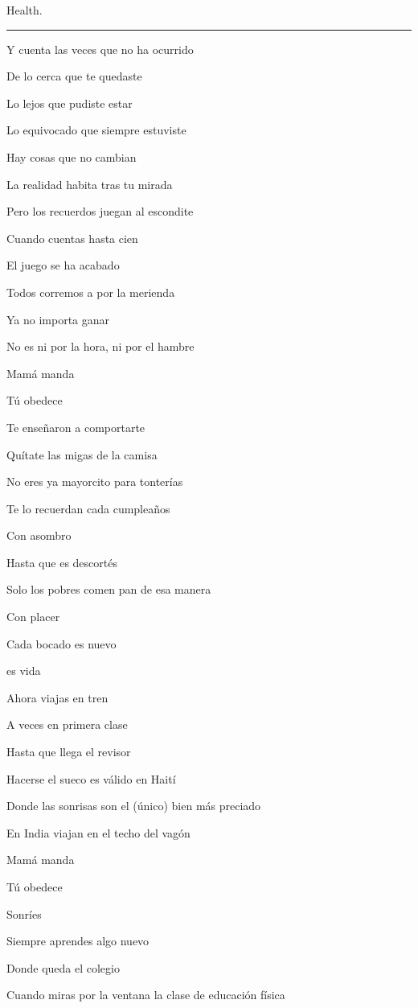 \documentclass[]{book}
\begin{document}
Health.

\begin{center}\rule{0.5\linewidth}{\linethickness}\end{center}

Y cuenta las veces que no ha ocurrido

De lo cerca que te quedaste

Lo lejos que pudiste estar

Lo equivocado que siempre estuviste

Hay cosas que no cambian

La realidad habita tras tu mirada

Pero los recuerdos juegan al escondite

Cuando cuentas hasta cien

El juego se ha acabado

Todos corremos a por la merienda

Ya no importa ganar

No es ni por la hora, ni por el hambre

Mamá manda

Tú obedece

Te enseñaron a comportarte

Quítate las migas de la camisa

No eres ya mayorcito para tonterías

Te lo recuerdan cada cumpleaños

Con asombro

Hasta que es descortés

Solo los pobres comen pan de esa manera

Con placer

Cada bocado es nuevo

es vida

Ahora viajas en tren

A veces en primera clase

Hasta que llega el revisor

Hacerse el sueco es válido en Haití

Donde las sonrisas son el (único) bien más preciado

En India viajan en el techo del vagón

Mamá manda

Tú obedece

Sonríes

Siempre aprendes algo nuevo

Donde queda el colegio

Cuando miras por la ventana la clase de educación física
\end{document}

